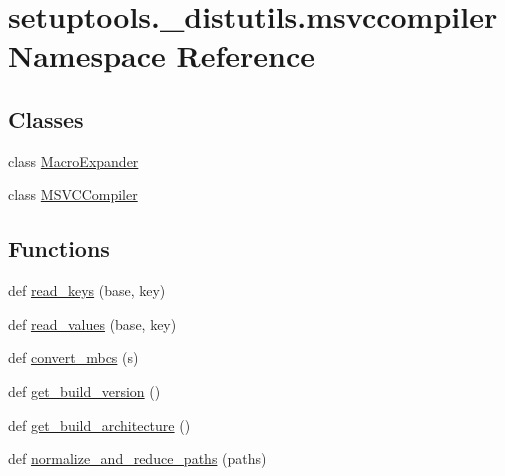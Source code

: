 \hypertarget{namespacesetuptools_1_1__distutils_1_1msvccompiler}{}\section{setuptools.\+\_\+distutils.\+msvccompiler Namespace Reference}
\label{namespacesetuptools_1_1__distutils_1_1msvccompiler}
\subsection*{Classes}
\begin{DoxyCompactItemize}
\item 
class \hyperlink{classsetuptools_1_1__distutils_1_1msvccompiler_1_1MacroExpander}{Macro\+Expander}
\item 
class \hyperlink{classsetuptools_1_1__distutils_1_1msvccompiler_1_1MSVCCompiler}{M\+S\+V\+C\+Compiler}
\end{DoxyCompactItemize}
\subsection*{Functions}
\begin{DoxyCompactItemize}
\item 
def \hyperlink{namespacesetuptools_1_1__distutils_1_1msvccompiler_a1d87ae271ef1707ccc90db95c812e128}{read\+\_\+keys} (base, key)
\item 
def \hyperlink{namespacesetuptools_1_1__distutils_1_1msvccompiler_ac58dc18b704a3914bdca378080073057}{read\+\_\+values} (base, key)
\item 
def \hyperlink{namespacesetuptools_1_1__distutils_1_1msvccompiler_aa0247cf20fe2ba8465368129bc16f361}{convert\+\_\+mbcs} (s)
\item 
def \hyperlink{namespacesetuptools_1_1__distutils_1_1msvccompiler_a22efae61560dab1dbd9dec102472198a}{get\+\_\+build\+\_\+version} ()
\item 
def \hyperlink{namespacesetuptools_1_1__distutils_1_1msvccompiler_a8b795cf00754e9b4be67c5798f5d1ecd}{get\+\_\+build\+\_\+architecture} ()
\item 
def \hyperlink{namespacesetuptools_1_1__distutils_1_1msvccompiler_a5844eddc8cf5e6dde2a82f28c6f88e2a}{normalize\+\_\+and\+\_\+reduce\+\_\+paths} (paths)
\end{DoxyCompactItemize}
